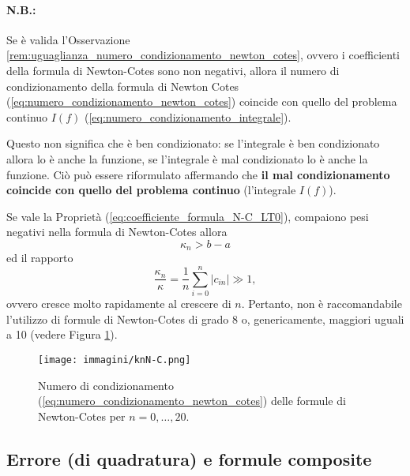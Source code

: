 
\paragraph{N.B.:} Se è valida l'Osservazione \ref{rem:uguaglianza_numero_condizionamento_newton_cotes}, ovvero i coefficienti della formula di Newton-Cotes sono non negativi, allora il numero di condizionamento della formula di Newton Cotes (\ref{eq:numero_condizionamento_newton_cotes}) coincide con quello del problema continuo $I(f)$ (\ref{eq:numero_condizionamento_integrale}).

Questo non significa che è ben condizionato: se l'integrale è ben condizionato allora lo è anche la funzione, se l'integrale è mal condizionato lo è anche la funzione. Ciò può essere riformulato affermando che \textbf{il mal condizionamento coincide con quello del problema continuo} (l'integrale $I(f)$).

\begin{remark}
	Se vale la Proprietà (\ref{eq:coefficiente_formula_N-C_LT0}), compaiono pesi negativi nella formula di Newton-Cotes allora 
	\begin{equation*}
		\kappa_n> b-a
	\end{equation*}
	ed il rapporto \begin{equation*}
		\frac{\kappa_n}{\kappa}=\frac{1}{n}\sum_{i=0}^n|c_{in}| \gg 1,
	\end{equation*}
	ovvero cresce molto rapidamente al crescere di $n$. Pertanto, non è raccomandabile l'utilizzo di formule di Newton-Cotes di grado 8 o, genericamente, maggiori uguali a 10 (vedere Figura \ref{fig:knN-C}).
\end{remark}

\begin{figure}[H]
    \centering
    \texttt{[image: immagini/knN-C.png]}
    \caption{Numero di condizionamento (\ref{eq:numero_condizionamento_newton_cotes}) delle formule di Newton-Cotes per $n=0,\hdots, 20$.}\label{fig:knN-C}
\end{figure}

\subsection{Errore (di quadratura) e formule composite}
